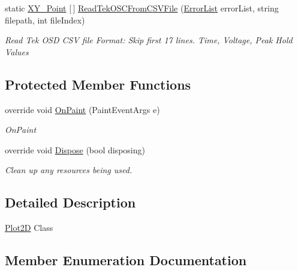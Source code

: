 \begin{DoxyCompactItemize}
static \mbox{\hyperlink{struct_c_s_i_1_1_library_1_1_data_types_1_1_x_y___point}{X\+Y\+\_\+\+Point}} \mbox{[}$\,$\mbox{]} \mbox{\hyperlink{class_c_s_i_1_1_library_1_1_plotting_lib_1_1_plot2_d_a07bb248c172593f7bd5554a8452135e4}{Read\+Tek\+O\+S\+C\+From\+C\+S\+V\+File}} (\mbox{\hyperlink{class_c_s_i_1_1_library_1_1_errors_1_1_error_list}{Error\+List}} error\+List, string filepath, int file\+Index)
\begin{DoxyCompactList}\small\item\em Read Tek O\+SD C\+SV file Format\+: Skip first 17 lines. Time, Voltage, Peak Hold Values \end{DoxyCompactList}\end{DoxyCompactItemize}
\subsection*{Protected Member Functions}
\begin{DoxyCompactItemize}
\item 
override void \mbox{\hyperlink{class_c_s_i_1_1_library_1_1_plotting_lib_1_1_plot2_d_a6376cff01d26a22a8012d55e8af2eb94}{On\+Paint}} (Paint\+Event\+Args e)
\begin{DoxyCompactList}\small\item\em On\+Paint \end{DoxyCompactList}\item 
override void \mbox{\hyperlink{class_c_s_i_1_1_library_1_1_plotting_lib_1_1_plot2_d_afe5dde960d2dbef84ca47248f330efd8}{Dispose}} (bool disposing)
\begin{DoxyCompactList}\small\item\em Clean up any resources being used. \end{DoxyCompactList}\end{DoxyCompactItemize}


\subsection{Detailed Description}
\mbox{\hyperlink{class_c_s_i_1_1_library_1_1_plotting_lib_1_1_plot2_d}{Plot2D}} Class 



\subsection{Member Enumeration Documentation}
\mbox{\label{class_c_s_i_1_1_library_1_1_plotting_lib_1_1_plot2_d_a8d130cc123e2a798267192fa0c2af225}} 
